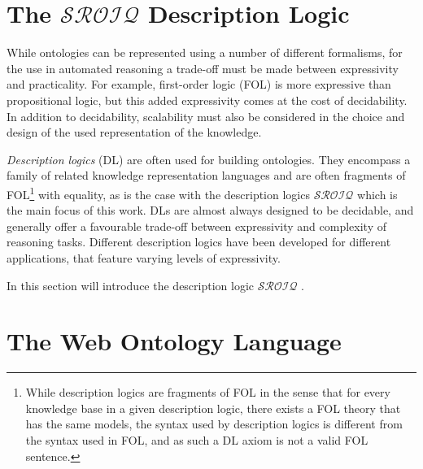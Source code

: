 
\section{The \texorpdfstring{$\mathcal{SROIQ}$}{SROIQ} Description Logic} \label{sroiq-def}

While ontologies can be represented using a number of different formalisms, for the use in automated reasoning a trade-off must be made between expressivity and practicality. For example, first-order logic (FOL) is more expressive than propositional logic, but this added expressivity comes at the cost of decidability. In addition to decidability, scalability must also be considered in the choice and design of the used representation of the knowledge.

\emph{Description logics} (DL) are often used for building ontologies. They encompass a family of related knowledge representation languages and are often fragments of FOL\footnote{While description logics are fragments of FOL in the sense that for every knowledge base in a given description logic, there exists a FOL theory that has the same models, the syntax used by description logics is different from the syntax used in FOL, and as such a DL axiom is not a valid FOL sentence.} with equality, as is the case with the description logics $\mathcal{SROIQ}$ which is the main focus of this work. DLs are almost always designed to be decidable, and generally offer a favourable trade-off between expressivity and complexity of reasoning tasks. Different description logics have been developed for different applications, that feature varying levels of expressivity.

In this section will introduce the description logic $\mathcal{SROIQ}$ \cite{horrocks2006even, rudolph2011foundations, baader_horrocks_lutz_sattler_2017}.



\section{The Web Ontology Language} \label{owl-def}


